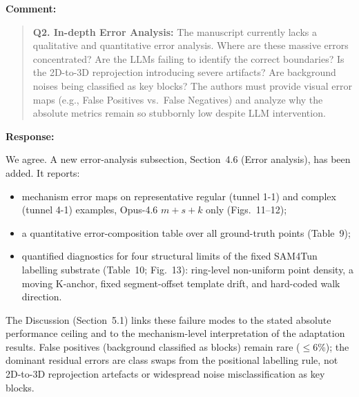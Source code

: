 \documentclass[11pt,a4paper]{article}
\newenvironment{commentblock}{%
  \par\smallskip\noindent\textbf{Comment:}\par
  \begin{quote}\itshape\color{black}
}{%
  \end{quote}\smallskip
}
\newenvironment{responseblock}{%
  \par\smallskip\noindent\textbf{Response:}\par
  \begingroup\color{responsegreen}
}{%
  \endgroup\smallskip
}
\begin{document}
\begin{commentblock}
\textbf{Q2. In-depth Error Analysis:} The manuscript currently lacks a qualitative and quantitative error analysis. Where are these massive errors concentrated? Are the LLMs failing to identify the correct boundaries? Is the 2D-to-3D reprojection introducing severe artifacts? Are background noises being classified as key blocks? The authors must provide visual error maps (e.g., False Positives vs.\ False Negatives) and analyze why the absolute metrics remain so stubbornly low despite LLM intervention.
\end{commentblock}
\begin{responseblock}
We agree. A new error-analysis subsection, Section~4.6 (Error analysis), has been added. It reports:
\begin{itemize}[nosep]
  \item mechanism error maps on representative regular (tunnel 1-1) and complex (tunnel 4-1) examples, Opus-4.6 \mbox{$m+s+k$} only (Figs.~11--12);
  \item a quantitative error-composition table over all ground-truth points (Table~9);
  \item quantified diagnostics for four structural limits of the fixed SAM4Tun labelling substrate (Table~10; Fig.~13): ring-level non-uniform point density, a moving K-anchor, fixed segment-offset template drift, and hard-coded walk direction.
\end{itemize}
The Discussion (Section~5.1) links these failure modes to the stated absolute performance ceiling and to the mechanism-level interpretation of the adaptation results. False positives (background classified as blocks) remain rare ($\leq$6\%); the dominant residual errors are class swaps from the positional labelling rule, not 2D-to-3D reprojection artefacts or widespread noise misclassification as key blocks.
\end{responseblock}
\end{document}
